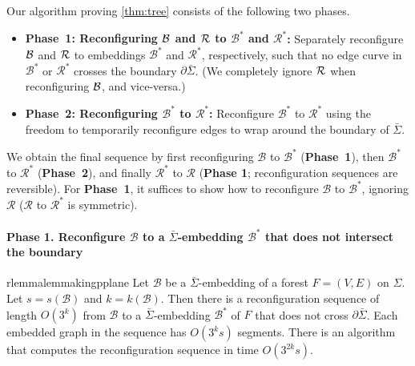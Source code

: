 \documentclass[a4paper,USenglish,cleveref,colorlinks=true,urlcolor=black,linkcolor=black,citecolor=black,thm-restate,authorcolumns]{lipics-v2021}
\newcommand{\prooflink}[1]{\hypersetup{linkcolor=lipicsBulletGray}\hyperref[#1]{$\blacktriangledown$}}
\newcommand{\statlink}[1]{\hypersetup{linkcolor=lipicsYellow}\hyperref[#1]{$\blacktriangle$}}
\newcommand{\mylink}{}
\theoremstyle{claimstyle}
\begin{document}
\noindent Our algorithm proving \cref{thm:tree} consists of the following two phases.
\begin{itemize}
    \item \textsf{\bfseries \textcolor{lipicsLineGray}{Phase~1:  Reconfiguring $\cal B$ and $\cal R$ to $\mathcal{B}^*$ and  $\mathcal{R}^*$}:} Separately reconfigure $\cal B$ and $\cal R$ to embeddings $\mathcal{B}^*$ and  $\mathcal{R}^*$, respectively, such that no edge curve in $\mathcal{B}^*$ or  $\mathcal{R}^*$ crosses the boundary  $\partial \bar{\Sigma}$. (We completely ignore $\cal R$ when reconfiguring $\cal B$, and vice-versa.)

    \item \textsf{\bfseries \textcolor{lipicsLineGray}{Phase~2:  Reconfiguring $\mathcal{B}^*$ to  $\mathcal{R}^*$:}}
          Reconfigure
          $\mathcal{B}^*$ to  $\mathcal{R}^*$ using the freedom to temporarily reconfigure edges to wrap around the boundary of $\bar\Sigma$.
\end{itemize}

We obtain the final sequence by
first reconfiguring $\mathcal{B}$ to $\mathcal{B}^*$ (\textsf{\bfseries \textcolor{lipicsLineGray}{Phase~1}}), then $\mathcal{B}^*$ to $\mathcal{R}^*$ (\textsf{\bfseries \textcolor{lipicsLineGray}{Phase~2}}), and finally $\mathcal{R}^*$ to $\mathcal{R}$ (\textsf{\bfseries \textcolor{lipicsLineGray}{Phase 1}}; reconfiguration sequences are reversible).
For \textsf{\bfseries \textcolor{lipicsLineGray}{Phase~1}}, it suffices to show how to reconfigure $\mathcal{B}$ to $\mathcal{B}^*$, ignoring $\mathcal{R}$ ($\mathcal{R}$ to $\mathcal{R}^*$ is symmetric).


\paragraph*{Phase 1. Reconfigure $\mathcal{B}$ to a $\bar\Sigma$-embedding $\mathcal{B}^*$  that does not intersect the boundary}



\begin{restatable}{rlemma}{lemmakingpplane}
    \label{lem:making-p-plane}
    \renewcommand{\mylink}{\statlink{lem:making-p-plane}\prooflink{Plemmakingpplane}}
    Let $\mathcal B$ be a $\bar{\Sigma}$-embedding of a forest $F=(V,E)$ on ${\Sigma}$.
    Let $s = s({\mathcal B})$ and $k = k({\mathcal B})$.
    Then there is a reconfiguration sequence of length $O(3^k)$ from $\mathcal{B}$ to a $\bar{\Sigma}$-embedding $\mathcal{B}^*$ of $F$ that does not cross $\partial \bar{\Sigma}$.
    Each embedded graph in the sequence has $O(3^k s)$ segments.
    There is an algorithm that computes the reconfiguration sequence in time $O(3^{2k} s)$.
\end{restatable}
\end{document}
